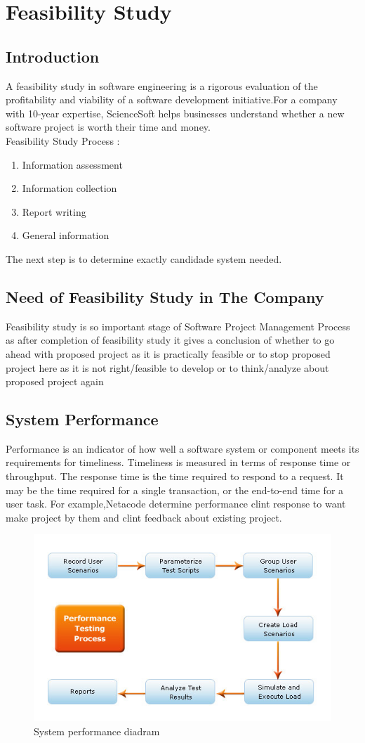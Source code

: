 \documentclass[a4paper,12pt]{report}
\begin{document}
\chapter{Feasibility Study}
\section{Introduction}
A feasibility study in software engineering is a rigorous evaluation of the profitability and viability of a software development initiative.For a  company with 10-year expertise, ScienceSoft helps businesses understand whether a new software project is worth their time and money.
\\Feasibility Study Process : \\
\begin{enumerate}
	\item	Information assessment
	\item Information collection
	\item Report writing
	\item General information
\end{enumerate}
The next step is to determine exactly candidade system needed.\\
\section{Need of Feasibility Study in The Company} 
Feasibility study is so important stage of Software Project Management Process as after completion of feasibility study it gives a conclusion of whether to go ahead with proposed project as it is practically feasible or to stop proposed project here as it is not right/feasible to develop or to think/analyze about proposed project again
\section{System Performance}
Performance is an indicator of how well a software system or component meets its requirements for timeliness. Timeliness is measured in terms of response time or throughput. The response time is the time required to respond to a request. It may be the time required for a single transaction, or the end-to-end time for a user task. For example,Netacode determine performance clint response to want make project by them and clint feedback about existing project.\newpage
\begin{figure}[h]
	\centering
	\includegraphics[width=0.8\linewidth]{Performance-Testing-Process}
	\caption{System performance diadram}
	\label{fig:performance-testing-process}
\end{figure}
\end{document}
